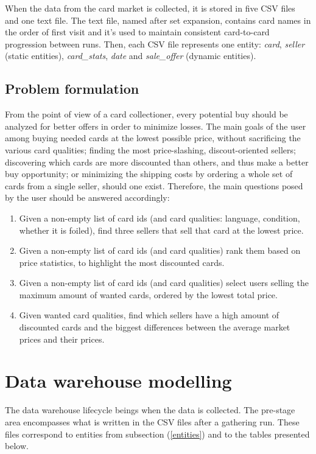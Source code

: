 When the data from the card market is collected, it is stored in five CSV files and one text file. The text file, named after set expansion, contains card names in the order of first visit and it's used to maintain consistent card-to-card progression between runs. Then, each CSV file represents one entity: \textit{card}, \textit{seller} (static entities), \textit{card\_stats}, \textit{date} and \textit{sale\_offer} (dynamic entities).

\subsection{Problem formulation}
From the point of view of a card collectioner, every potential buy should be analyzed for better offers in order to minimize losses. The main goals of the user among buying needed cards at the lowest possible price, without sacrificing the various card qualities; finding the most price-slashing, discout-oriented sellers; discovering which cards are more discounted than others, and thus make a better buy opportunity; or minimizing the shipping costs by ordering a whole set of cards from a single seller, should one exist. Therefore, the main questions posed by the user should be answered accordingly:
\begin{enumerate}
\item Given a non-empty list of card ids (and card qualities: language, condition, whether it is foiled), find three sellers that sell that card at the lowest price.
\item Given a non-empty list of card ids (and card qualities) rank them based on price statistics, to highlight the most discounted cards.
\item Given a non-empty list of card ids (and card qualities) select users selling the maximum amount of wanted cards, ordered by the lowest total price.
\item Given wanted card qualities, find which sellers have a high amount of discounted cards and the biggest differences between the average market prices and their prices.
\end{enumerate}

\section{Data warehouse modelling}
The data warehouse lifecycle beings when the data is collected. The pre-stage area encompasses what is written in the CSV files after a gathering run. These files correspond to entities from subsection (\ref{entities}) and to the tables presented below.


